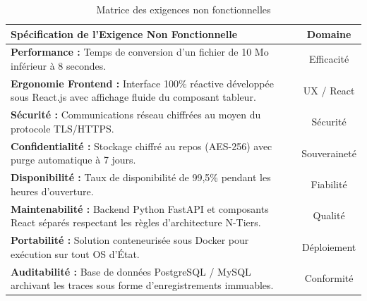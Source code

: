 \begin{table}[H]
\centering
\small
\begin{tabular}{|L{11.5cm}|c|}
\hline
{}
\textbf{Spécification de l'Exigence Non Fonctionnelle} & \textbf{Domaine} \\
\hline
\textbf{Performance :} Temps de conversion d'un fichier de 10 Mo inférieur à 8 secondes. & Efficacité \\
\hline
\textbf{Ergonomie Frontend :} Interface 100\% réactive développée sous React.js avec affichage fluide du composant tableur. & UX / React \\
\hline
\textbf{Sécurité :} Communications réseau chiffrées au moyen du protocole TLS/HTTPS. & Sécurité \\
\hline
\textbf{Confidentialité :} Stockage chiffré au repos (AES-256) avec purge automatique à 7 jours. & Souveraineté \\
\hline
\textbf{Disponibilité :} Taux de disponibilité de 99,5\% pendant les heures d'ouverture. & Fiabilité \\
\hline
\textbf{Maintenabilité :} Backend Python FastAPI et composants React séparés respectant les règles d'architecture N-Tiers. & Qualité \\
\hline
\textbf{Portabilité :} Solution conteneurisée sous Docker pour exécution sur tout OS d'État. & Déploiement \\
\hline
\textbf{Auditabilité :} Base de données PostgreSQL / MySQL archivant les traces sous forme d'enregistrements immuables. & Conformité \\
\hline
\end{tabular}
\caption{Matrice des exigences non fonctionnelles}
\end{table}
